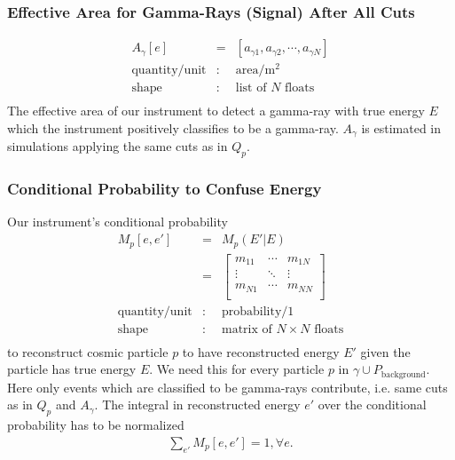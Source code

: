 \documentclass{article}%
\begin{document}
        \subsubsection*{Effective Area for Gamma-Rays (Signal) After All Cuts}
            \begin{eqnarray*}
                A_\gamma[e] &=& [a_{\gamma 1}, a_{\gamma 2}, \cdots, a_{\gamma N}]\\
                \text{quantity}/\text{unit} &:& \text{area} / \text{m}^{2}\\
                \text{shape} &:& \text{list of}\,\,N\,\,\text{floats}\\
            \end{eqnarray*}
            The effective area of our instrument to detect a gamma-ray with true energy $E$ which the instrument positively classifies to be a gamma-ray.
            $A_\gamma$ is estimated in simulations applying the same cuts as in $Q_p$.
        \subsubsection*{Conditional Probability to Confuse Energy}
            Our instrument's conditional probability
            \begin{eqnarray*}
                M_p[e, e'] &=& M_p(E' \vert E)\\
                &=&
                  \left[ {\begin{array}{ccc}
                    m_{11} & \cdots & m_{1N}\\
                    \vdots & \ddots & \vdots\\
                    m_{N1} & \cdots & m_{NN}\\
                  \end{array} } \right]\\
                \text{quantity}/\text{unit} &:& \text{probability}/1\\
                \text{shape} &:& \text{matrix of}\,\,N \times N \,\,\text{floats}\\
            \end{eqnarray*}
            to reconstruct cosmic particle $p$ to have reconstructed energy $E'$ given the particle has true energy $E$.
            We need this for every particle $p$ in $\gamma \cup P_\text{background}$.
            Here only events which are classified to be gamma-rays contribute, i.e. same cuts as in $Q_p$ and $A_\gamma$.
            The integral in reconstructed energy $e'$ over the conditional probability has to be normalized
            \begin{eqnarray*}
                \sum_{e'} M_p[e, e'] = 1, \forall e.
            \end{eqnarray*}
\end{document}
